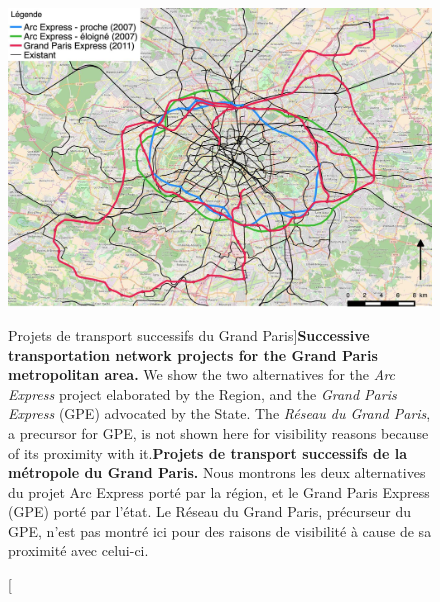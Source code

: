 {}



\begin{figure}
\includegraphics[width=\linewidth]{Figures/Final/1-2-1-fig-casestudies-projects.jpg}
\caption[][Projets de transport successifs du Grand Paris]{\textbf{Successive transportation network projects for the Grand Paris metropolitan area.} We show the two alternatives for the \emph{Arc Express} project elaborated by the Region, and the \emph{Grand Paris Express} (GPE) advocated by the State. The \emph{Réseau du Grand Paris}, a precursor for GPE, is not shown here for visibility reasons because of its proximity with it.\label{fig:projects}}{\textbf{Projets de transport successifs de la métropole du Grand Paris.} Nous montrons les deux alternatives du projet Arc Express porté par la région, et le Grand Paris Express (GPE) porté par l'état. Le Réseau du Grand Paris, précurseur du GPE, n'est pas montré ici pour des raisons de visibilité à cause de sa proximité avec celui-ci.\label{fig:casestudies:projects}}
\end{figure}


